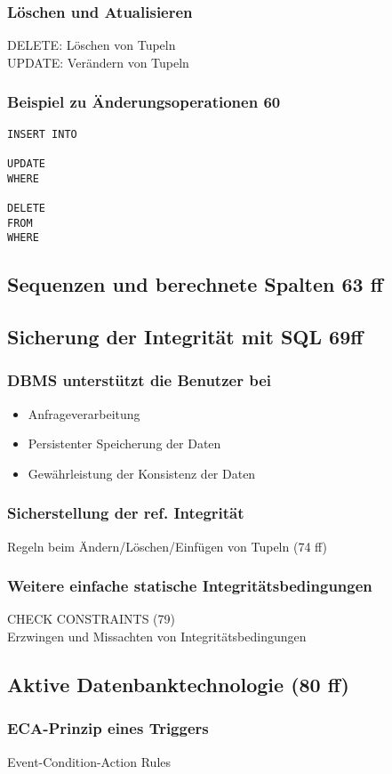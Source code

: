 \subsubsection{Löschen und Atualisieren}
DELETE: Löschen von Tupeln\\
UPDATE: Verändern von Tupeln
\subsubsection{Beispiel zu Änderungsoperationen 60}
\begin{lstlisting}
INSERT INTO

UPDATE
WHERE

DELETE
FROM 
WHERE
\end{lstlisting}
\subsection{Sequenzen und berechnete Spalten 63 ff}
\subsection{Sicherung der Integrität mit SQL 69ff}
\subsubsection{DBMS unterstützt die Benutzer bei}
\begin{itemize}
	\item Anfrageverarbeitung
	\item Persistenter Speicherung der Daten
	\item Gewährleistung der Konsistenz der Daten
\end{itemize}
\subsubsection{Sicherstellung der ref. Integrität}
Regeln beim Ändern/Löschen/Einfügen von Tupeln (74 ff)
\subsubsection{Weitere einfache statische Integritätsbedingungen}
CHECK CONSTRAINTS (79)\\
Erzwingen und Missachten von Integritätsbedingungen
\subsection{Aktive Datenbanktechnologie (80 ff)}
\subsubsection{ECA-Prinzip eines Triggers}
Event-Condition-Action Rules
